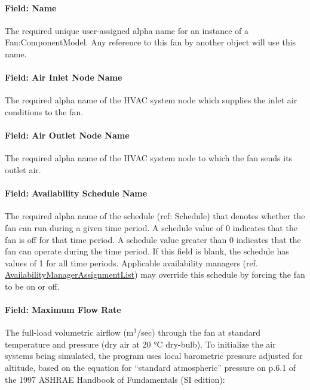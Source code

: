 \paragraph{Field: Name}\label{field-name-4-011}

The required unique user-assigned alpha name for an instance of a Fan:ComponentModel. Any reference to this fan by another object will use this name.

\paragraph{Field: Air Inlet Node Name}\label{field-air-inlet-node-name-4-000}

The required alpha name of the HVAC system node which supplies the inlet air conditions to the fan.

\paragraph{Field: Air Outlet Node Name}\label{field-air-outlet-node-name-4-000}

The required alpha name of the HVAC system node to which the fan sends its outlet air.

\paragraph{Field: Availability Schedule Name}\label{field-availability-schedule-name-4-002}

The required alpha name of the schedule (ref: Schedule) that denotes whether the fan can run during a given time period. A schedule value of 0 indicates that the fan is off for that time period. A schedule value greater than 0 indicates that the fan can operate during the time period. If this field is blank, the schedule has values of 1 for all time periods. Applicable availability managers (ref. \hyperref[availabilitymanagerassignmentlist]{AvailabilityManagerAssignmentList}) may override this schedule by forcing the fan to be on or off.

\paragraph{Field: Maximum Flow Rate}\label{field-maximum-flow-rate-5}

The full-load volumetric airflow (m\(^{3}\)/sec) through the fan at standard temperature and pressure (dry air at 20 °C dry-bulb). To initialize the air systems being simulated, the program uses local barometric pressure adjusted for altitude, based on the equation for ``standard atmospheric'' pressure on p.6.1 of the 1997 ASHRAE Handbook of Fundamentals (SI edition):

